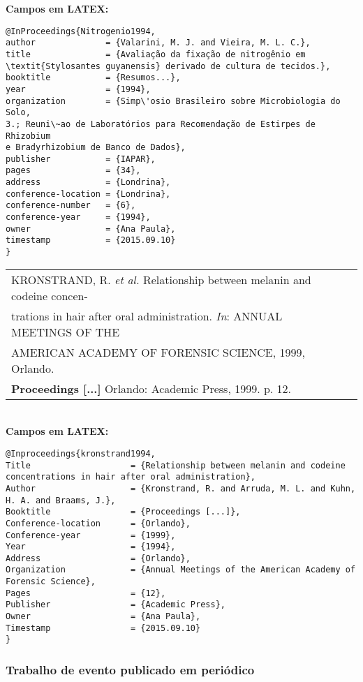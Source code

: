 \textbf{Campos em LATEX:} 


\begin{verbatim}
@InProceedings{Nitrogenio1994,
author              = {Valarini, M. J. and Vieira, M. L. C.},
title               = {Avaliação da fixação de nitrogênio em 
\textit{Stylosantes guyanensis} derivado de cultura de tecidos.},
booktitle           = {Resumos...},
year                = {1994},
organization        = {Simp\'osio Brasileiro sobre Microbiologia do Solo, 
3.; Reuni\~ao de Laboratórios para Recomendação de Estirpes de Rhizobium 
e Bradyrhizobium de Banco de Dados},
publisher           = {IAPAR},
pages               = {34},
address             = {Londrina},
conference-location = {Londrina},
conference-number   = {6},
conference-year     = {1994},
owner               = {Ana Paula},
timestamp           = {2015.09.10}
}
\end{verbatim}

\begin{tabular}{|l|c|} \hline
	KRONSTRAND, R. \textit{et al.} Relationship between melanin and codeine
	concen-\\trations in hair after oral administration. \textit{In}: ANNUAL MEETINGS OF THE \\AMERICAN  ACADEMY OF FORENSIC SCIENCE, 1999, Orlando. \\\textbf{Proceedings [...]} Orlando:  Academic Press, 1999. p. 12.   \\\hline
\end{tabular} \\

\textbf{Campos em LATEX:} 

\begin{verbatim}
@Inproceedings{kronstrand1994,
Title                    = {Relationship between melanin and codeine
concentrations in hair after oral administration},
Author                   = {Kronstrand, R. and Arruda, M. L. and Kuhn, 
H. A. and Braams, J.},
Booktitle                = {Proceedings [...]},
Conference-location      = {Orlando},
Conference-year          = {1999},
Year                     = {1994},
Address                  = {Orlando},
Organization             = {Annual Meetings of the American Academy of 
Forensic Science},
Pages                    = {12},
Publisher                = {Academic Press},
Owner                    = {Ana Paula},
Timestamp                = {2015.09.10}
}
\end{verbatim}

\subsubsection{Trabalho de evento publicado em periódico} 

